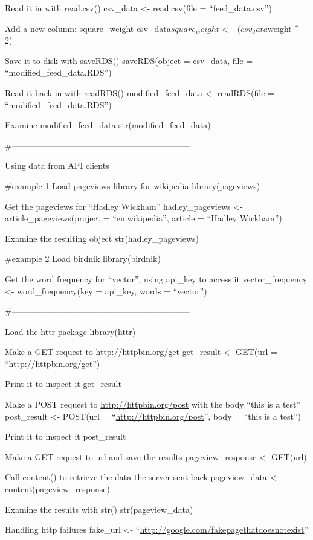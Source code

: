 \documentclass[]{book}
\begin{document}
Read it in with read.csv()
csv\_data \textless{}- read.csv(file = ``feed\_data.csv'')

Add a new column: square\_weight
csv\_data\(square_weight <- (csv_data\)weight \^{} 2)

Save it to disk with saveRDS()
saveRDS(object = csv\_data, file = ``modified\_feed\_data.RDS'')

Read it back in with readRDS()
modified\_feed\_data \textless{}- readRDS(file = ``modified\_feed\_data.RDS'')

Examine modified\_feed\_data
str(modified\_feed\_data)

\#---------------------------------------------------------------

Using data from API clients

\#example 1
Load pageviews library for wikipedia
library(pageviews)

Get the pageviews for ``Hadley Wickham''
hadley\_pageviews \textless{}- article\_pageviews(project = ``en.wikipedia'', article = ``Hadley Wickham'')

Examine the resulting object
str(hadley\_pageviews)

\#example 2
Load birdnik
library(birdnik)

Get the word frequency for ``vector'', using api\_key to access it
vector\_frequency \textless{}- word\_frequency(key = api\_key, words = ``vector'')

\#---------------------------------------------------------------

Load the httr package
library(httr)

Make a GET request to \url{http://httpbin.org/get}
get\_result \textless{}- GET(url = ``\url{http://httpbin.org/get}'')

Print it to inspect it
get\_result

Make a POST request to \url{http://httpbin.org/post} with the body ``this is a test''
post\_result \textless{}- POST(url = ``\url{http://httpbin.org/post}'', body = ``this is a test'')

Print it to inspect it
post\_result

Make a GET request to url and save the results
pageview\_response \textless{}- GET(url)

Call content() to retrieve the data the server sent back
pageview\_data \textless{}- content(pageview\_response)

Examine the results with str()
str(pageview\_data)

Handling http failures
fake\_url \textless{}- ``\url{http://google.com/fakepagethatdoesnotexist}''
\end{document}
